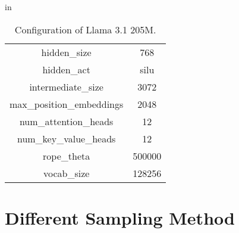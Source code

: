 \begin{table}[ht]
 in
    \renewcommand\arraystretch{1.2}
    \centering
    \small
    \caption{Configuration of Llama 3.1 205M.}
    \label{tab:llama_205m}
    \vskip 0.15in
    \begin{tabular}{c|c}
    \toprule
       hidden\_size  & 768 \\
       hidden\_act & silu \\
       intermediate\_size & 3072 \\
       max\_position\_embeddings & 2048 \\
       num\_attention\_heads & 12 \\
       num\_key\_value\_heads & 12 \\
       rope\_theta & 500000 \\
       vocab\_size & 128256 \\
    \bottomrule
    \end{tabular}
    \vskip -0.1in
\end{table}



% 

\section{Different Sampling Method}
\label{app:sample}
